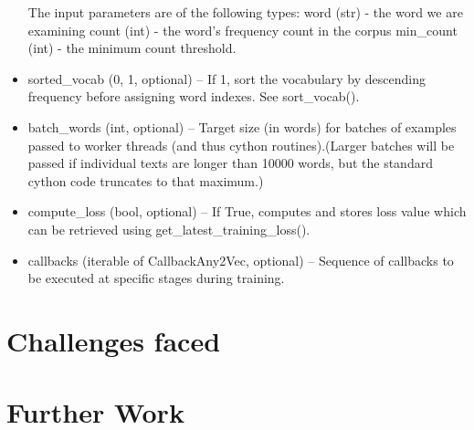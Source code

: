 \begin{itemize}
    The input parameters are of the following types:
            word (str) - the word we are examining
            count (int) - the word’s frequency count in the corpus
            min\_count (int) - the minimum count threshold.

  \item  sorted\_vocab ({0, 1}, optional) – If 1, sort the vocabulary by descending frequency before assigning word indexes. See sort\_vocab().
 \item   batch\_words (int, optional) – Target size (in words) for batches of examples passed to worker threads (and thus cython routines).(Larger batches will be passed if individual texts are longer than 10000 words, but the standard cython code truncates to that maximum.)
  \item  compute\_loss (bool, optional) – If True, computes and stores loss value which can be retrieved using get\_latest\_training\_loss().
 \item   callbacks (iterable of CallbackAny2Vec, optional) – Sequence of callbacks to be executed at specific stages during training.

\end{itemize}





\section{Challenges faced}
\section{Further Work}